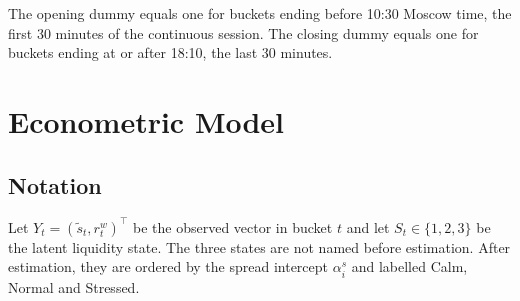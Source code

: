 \documentclass[12pt,a4paper]{article}
\begin{document}
The opening dummy equals one for buckets ending before 10:30 Moscow time, the first 30 minutes of the continuous session. The closing dummy equals one for buckets ending at or after 18:10, the last 30 minutes.

\section{Econometric Model}\label{sec:model}

\subsection{Notation}\label{sec:notation}

Let \(Y_t=(\tilde{s}_t,r_t^w)^\top\) be the observed vector in bucket \(t\)  and let \(S_t\in\{1,2,3\}\) be the latent liquidity state. The three states are not named before estimation. After estimation, they are ordered by the spread intercept \(\alpha^s_i\) and labelled Calm, Normal  and Stressed.
\end{document}
